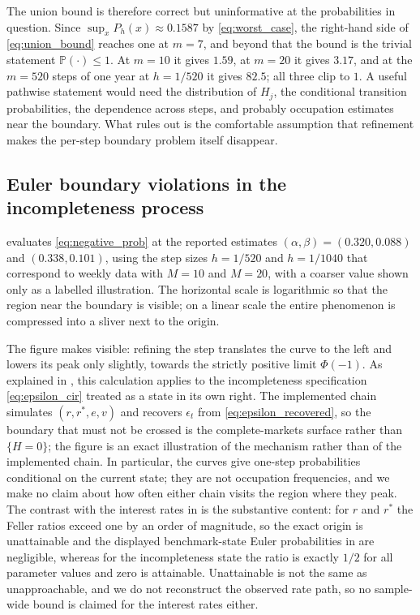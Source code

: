 \documentclass[11pt]{article}
\theoremstyle{definition}
\newcommand{\Pp}{\mathbb{P}}
\begin{document}
The union bound is therefore correct but uninformative at the probabilities in question. Since $\sup_xP_h(x)\approx0.1587$ by \eqref{eq:worst_case}, the right-hand side of \eqref{eq:union_bound} reaches one at $m=7$, and beyond that the bound is the trivial statement $\Pp(\cdot)\le1$. At $m=10$ it gives $1.59$, at $m=20$ it gives $3.17$, and at the $m=520$ steps of one year at $h=1/520$ it gives $82.5$; all three clip to $1$. A useful pathwise statement would need the distribution of $H_j$, the conditional transition probabilities, the dependence across steps, and probably occupation estimates near the boundary. What  rules out is the comfortable assumption that refinement makes the per-step boundary problem itself disappear.

\subsection{Euler boundary violations in the incompleteness process}

 evaluates \eqref{eq:negative_prob} at the reported estimates $(\alpha,\beta)=(0.320,0.088)$ and $(0.338,0.101)$, using the step sizes $h=1/520$ and $h=1/1040$ that correspond to weekly data with $M=10$ and $M=20$, with a coarser value shown only as a labelled illustration. The horizontal scale is logarithmic so that the region near the boundary is visible; on a linear scale the entire phenomenon is compressed into a sliver next to the origin.

The figure makes  visible: refining the step translates the curve to the left and lowers its peak only slightly, towards the strictly positive limit $\Phi(-1)$. As explained in , this calculation applies to the incompleteness specification \eqref{eq:epsilon_cir} treated as a state in its own right. The implemented chain simulates $(r,r^*,e,v)$ and recovers $\epsilon_t$ from \eqref{eq:epsilon_recovered}, so the boundary that must not be crossed is the complete-markets surface rather than $\{H=0\}$; the figure is an exact illustration of the mechanism rather than of the implemented chain. In particular, the curves give one-step probabilities conditional on the current state; they are not occupation frequencies, and we make no claim about how often either chain visits the region where they peak. The contrast with the interest rates in  is the substantive content: for $r$ and $r^*$ the Feller ratios exceed one by an order of magnitude, so the exact origin is unattainable and the displayed benchmark-state Euler probabilities in  are negligible, whereas for the incompleteness state the ratio is exactly $1/2$ for all parameter values and zero is attainable. Unattainable is not the same as unapproachable, and we do not reconstruct the observed rate path, so no sample-wide bound is claimed for the interest rates either.
\end{document}

